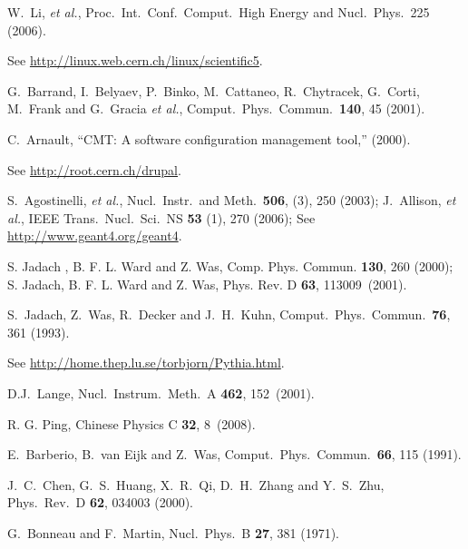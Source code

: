 \begin{thebibliography}{99}
  W.~Li, {\it et al.},
  Proc.\ Int.\ Conf.\ Comput.\ High Energy and Nucl.\ Phys.\ 225 (2006).

  See \url{http://linux.web.cern.ch/linux/scientific5}.

  G.~Barrand, I.~Belyaev, P.~Binko, M.~Cattaneo, R.~Chytracek, G.~Corti, M.~Frank and G.~Gracia {\it et al.},
  Comput.\ Phys.\ Commun.\  {\bf 140}, 45 (2001).

  C.~Arnault, ``CMT: A software configuration management tool,'' (2000).

  See \url{http://root.cern.ch/drupal}.

  S.~Agostinelli, {\it et al.}, Nucl.\ Instr.\ and Meth.\ {\bf 506}, (3), 250 (2003);
  J.~Allison, {\it et al.}, IEEE Trans.\ Nucl.\ Sci.\ NS {\bf 53} (1), 270 (2006);
  See \url{http://www.geant4.org/geant4}.

 S. Jadach , B. F. L. Ward and Z. Was,
  Comp. Phys. Commun. {\bf 130}, 260 (2000); S. Jadach, B. F. L. Ward
  and  Z. Was, Phys. Rev. D {\bf 63}, 113009~(2001).

  S.~Jadach, Z.~Was, R.~Decker and J.~H.~Kuhn,
  Comput.\ Phys.\ Commun.\  {\bf 76}, 361 (1993).

  See \url{http://home.thep.lu.se/torbjorn/Pythia.html}.

  D.J.~Lange,
  Nucl.\ Instrum.\ Meth.\ A {\bf 462},
  152~(2001).

  R. G. Ping, Chinese Physics C {\bf 32}, 8~(2008).

  E.~Barberio, B.~van Eijk and Z.~Was,
  Comput.\ Phys.\ Commun.\  {\bf 66}, 115 (1991).

  J.~C.~Chen, G.~S.~Huang, X.~R.~Qi, D.~H.~Zhang and Y.~S.~Zhu,
  Phys.\ Rev.\ D {\bf 62}, 034003 (2000).

  G.~Bonneau and F.~Martin,
  Nucl.\ Phys.\ B {\bf 27}, 381 (1971).


\end{thebibliography}
